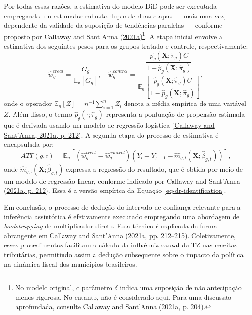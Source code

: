 \documentclass[12pt, a4paper, twoside]{article}
\numberwithin{equation}{subsection} %
\begin{document}
Por todas essas razões, a estimativa do modelo DiD pode ser executada
empregando um estimador robusto duplo de duas etapas --- mais uma vez,
dependente da validade da suposição de tendências paralelas --- conforme
proposto por Callaway and Sant'Anna
(\protect\hyperlink{ref-CALLAWAY2021200}{2021a})\footnote{No modelo
  original, o parâmetro \(\delta\) indica uma suposição de não
  antecipação menos rigorosa. No entanto, não é considerado aqui. Para
  uma discussão aprofundada, consulte Callaway and Sant'Anna
  (\protect\hyperlink{ref-CALLAWAY2021200}{2021a, p. 204}).}. A etapa
inicial envolve a estimativa dos seguintes pesos para os grupos tratado
e controle, respectivamente: \begin{equation*}
\widehat{w}_g^{treat} = \frac{G_g}{\mathbb{E}_n[G_g]}, \quad
\widehat{w}_g^{control} = \dfrac{ \dfrac{\widehat{p}_g(\boldsymbol{X}; \widehat{\pi}_g) C}{1 - \widehat{p}_g(\boldsymbol{X}; \widehat{\pi}_g)} }{\mathbb{E}_n \left[\dfrac{\widehat{p}_g(\boldsymbol{X}; \widehat{\pi}_g) C}{1 - \widehat{p}_g(\boldsymbol{X}; \widehat{\pi}_g)} \right]},
\end{equation*} onde o operador
\(\mathbb{E}_n[Z] = n^{-1} \sum_{i=1}^n Z_i\) denota a média empírica de
uma variável \(Z\). Além disso, o termo
\(\widehat{p}_g(\cdot; \widehat{\pi}_g)\) representa a pontuação de
propensão estimada que é derivada usando um modelo de regressão
logística (\protect\hyperlink{ref-CALLAWAY2021200}{Callaway and
Sant'Anna, 2021a, p. 212}). A segunda etapa do processo de estimativa é
encapsulada por: \begin{equation}
\label{eq-dr-estimation}
\widehat{ATT}(g, t) = \mathbb{E}_n \left[ (\widehat{w}_g^{treat} - \widehat{w}_g^{control}) (Y_t - Y_{g-1} - \widehat{m}_{g,t}(\boldsymbol{X}; \widehat{\beta}_{g,t}) ) \right],
\end{equation} onde
\(\widehat{m}_{g,t}(\boldsymbol{X}; \widehat{\beta}_{g,t})\) expressa a
regressão do resultado, que é obtida por meio de um modelo de regressão
linear, conforme indicado por Callaway and Sant'Anna
(\protect\hyperlink{ref-CALLAWAY2021200}{2021a, p. 212}). Essa é a
versão empírica da Equação \eqref{eq-dr-identification}.

Em conclusão, o processo de dedução do intervalo de confiança relevante
para a inferência assintótica é efetivamente executado empregando uma
abordagem de \textit{bootstrapping} de multiplicador direto. Essa
técnica é explicada de forma abrangente em Callaway and Sant'Anna
(\protect\hyperlink{ref-CALLAWAY2021200}{2021a, pp. 212--215}).
Coletivamente, esses procedimentos facilitam o cálculo da influência
causal da TZ nas receitas tributárias, permitindo assim a dedução
subsequente sobre o impacto da política na dinâmica fiscal dos
municípios brasileiros.
\end{document}
